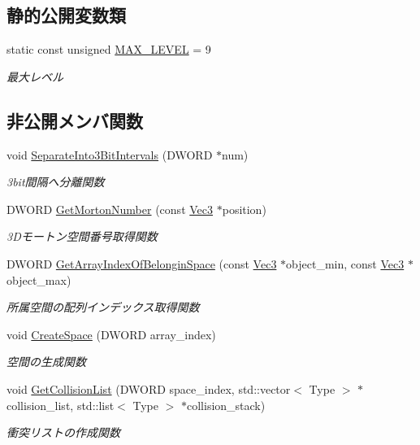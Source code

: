 \subsection*{静的公開変数類}
\begin{DoxyCompactItemize}
\item 
static const unsigned \mbox{\hyperlink{class_liner_octree_aced865f2822181486eb805e4db1f0a32}{M\+A\+X\+\_\+\+L\+E\+V\+EL}} = 9
\begin{DoxyCompactList}\small\item\em 最大レベル \end{DoxyCompactList}\end{DoxyCompactItemize}
\subsection*{非公開メンバ関数}
\begin{DoxyCompactItemize}
\item 
void \mbox{\hyperlink{class_liner_octree_acfa567ec0f969684f55443fc9ee98432}{Separate\+Into3\+Bit\+Intervals}} (D\+W\+O\+RD $\ast$num)
\begin{DoxyCompactList}\small\item\em 3bit間隔へ分離関数 \end{DoxyCompactList}\item 
D\+W\+O\+RD \mbox{\hyperlink{class_liner_octree_ad931e5f3ae94cd4337dd96d133ee42a8}{Get\+Morton\+Number}} (const \mbox{\hyperlink{_vector3_d_8h_ab16f59e4393f29a01ec8b9bbbabbe65d}{Vec3}} $\ast$position)
\begin{DoxyCompactList}\small\item\em 3\+Dモートン空間番号取得関数 \end{DoxyCompactList}\item 
D\+W\+O\+RD \mbox{\hyperlink{class_liner_octree_a4d7c6e47990d16ed28e3ab89443c1af4}{Get\+Array\+Index\+Of\+Belongin\+Space}} (const \mbox{\hyperlink{_vector3_d_8h_ab16f59e4393f29a01ec8b9bbbabbe65d}{Vec3}} $\ast$object\+\_\+min, const \mbox{\hyperlink{_vector3_d_8h_ab16f59e4393f29a01ec8b9bbbabbe65d}{Vec3}} $\ast$object\+\_\+max)
\begin{DoxyCompactList}\small\item\em 所属空間の配列インデックス取得関数 \end{DoxyCompactList}\item 
void \mbox{\hyperlink{class_liner_octree_a62aa42a787a399c3651bac3bbef8f1a6}{Create\+Space}} (D\+W\+O\+RD array\+\_\+index)
\begin{DoxyCompactList}\small\item\em 空間の生成関数 \end{DoxyCompactList}\item 
void \mbox{\hyperlink{class_liner_octree_aa166d590cbda54d856a732d0171f6554}{Get\+Collision\+List}} (D\+W\+O\+RD space\+\_\+index, std\+::vector$<$ Type $>$ $\ast$collision\+\_\+list, std\+::list$<$ Type $>$ $\ast$collision\+\_\+stack)
\begin{DoxyCompactList}\small\item\em 衝突リストの作成関数 \end{DoxyCompactList}\end{DoxyCompactItemize}
